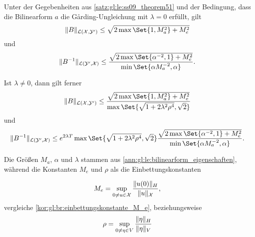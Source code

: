 \begin{Korollar}
\label{kor:gl:le:ss09_theorem51_ungleichungen}
    Unter der Gegebenheiten aus \cref{satz:gl:le:ss09_theorem51} und der Bedingung, dass die Bilinearform $a$ die G\aa{}rding-Ungleichung mit $\lambda = 0$ erfüllt, gilt
    \begin{equation}
        \norm{B}_{\mathcal L(\mathcal X, \mathcal Y')} \leq \sqrt{2 \max\Set{1, M_{a}^{2}} + M_{e}^{2}}
    \end{equation}
    und
    \begin{equation}
        \norm{B^{-1}}_{\mathcal L(\mathcal Y', \mathcal X)} \leq \frac{\sqrt{2 \max \Set{\alpha^{-2}, 1} + M_{e}^{2}}}{\min\Set{\alpha M_{a}^{-2}, \alpha}}.
    \end{equation}

    Ist $\lambda \neq 0$, dann gilt ferner
    \begin{equation}
        \label{kor:gl:le:norm_B_abschaetzung}
        \norm{B}_{\mathcal L(\mathcal X, \mathcal Y')} \leq \frac{\sqrt{2\max\Set{1, M_{a}^{2}} + M_{e}^{2}}}{\max\Set{\sqrt{1 + 2 \lambda^{2} \rho^{4}}, \sqrt{2}}}
    \end{equation}
    und
    \begin{equation}
        \label{kor:gl:le:norm_B_inv_abschaetzung}
        \norm{B^{-1}}_{\mathcal L(\mathcal Y', \mathcal X)} \leq e^{2 \lambda T} \max\Set{\sqrt{1 + 2 \lambda^{2} \rho^{4}}, \sqrt{2}}  \frac{\sqrt{2 \max\Set{ \alpha^{-2}, 1} + M_{e}^{2}}}{\min\Set{\alpha M_{a}^{-2}, \alpha}}.
    \end{equation}

    Die Größen $M_{a}$, $\alpha$ und $\lambda$ stammen aus \cref{ann:gl:le:bilinearform_eigenschaften},
    während die Konstanten $M_{e}$ und $\rho$ als die Einbettungskonstanten

    \begin{equation}
        \label{kor:gl:le:einbettungskonstante_M_e}
        M_{e} = \sup_{0 \neq u \in \mathcal X} \frac{\lVert u(0)\rVert_{H}}{\lVert u\rVert_{\mathcal X}},
    \end{equation}
    vergleiche \cref{kor:gl:br:einbettungskonstante_M_e}, beziehungsweise
    \begin{equation}
        \label{kor:gl:le:einbettungskonstante_rho}
        \rho = \sup_{0 \neq \eta \in V} \frac{\lVert\eta\rVert_{H}}{\lVert\eta\rVert_{V}}
    \end{equation}

    \begin{Beweis}
        $\,$\newline
    \end{Beweis}
\end{Korollar}

